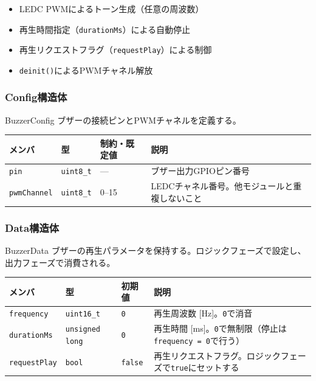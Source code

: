 \begin{itemize}
    \item LEDC PWMによるトーン生成（任意の周波数）
    \item 再生時間指定（\texttt{durationMs}）による自動停止
    \item 再生リクエストフラグ（\texttt{requestPlay}）による制御
    \item \texttt{deinit()}によるPWMチャネル解放
\end{itemize}

\subsubsection{Config構造体}

\begin{funcblock}{BuzzerConfig}
ブザーの接続ピンとPWMチャネルを定義する。

\begin{longtable}{l l l p{5.0cm}}
\toprule
\textbf{メンバ} & \textbf{型} & \textbf{制約・既定値} & \textbf{説明} \\
\midrule
\endhead
\texttt{pin}        & \texttt{uint8\_t} & ---         & ブザー出力GPIOピン番号 \\
\texttt{pwmChannel} & \texttt{uint8\_t} & 0--15       & LEDCチャネル番号。他モジュールと重複しないこと \\
\bottomrule
\end{longtable}
\end{funcblock}

\subsubsection{Data構造体}

\begin{funcblock}{BuzzerData}
ブザーの再生パラメータを保持する。ロジックフェーズで設定し、出力フェーズで消費される。

\begin{longtable}{l l l p{4.5cm}}
\toprule
\textbf{メンバ} & \textbf{型} & \textbf{初期値} & \textbf{説明} \\
\midrule
\endhead
\texttt{frequency}   & \texttt{uint16\_t}      & \texttt{0}     & 再生周波数 [Hz]。\texttt{0}で消音 \\
\texttt{durationMs}  & \texttt{unsigned long}  & \texttt{0}     & 再生時間 [ms]。\texttt{0}で無制限（停止は\texttt{frequency = 0}で行う） \\
\texttt{requestPlay} & \texttt{bool}           & \texttt{false} & 再生リクエストフラグ。ロジックフェーズで\texttt{true}にセットする \\
\bottomrule
\end{longtable}
\end{funcblock}

